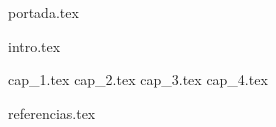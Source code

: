 \documentclass[12pt, a4paper]{article} %
\begin{document}

{portada.tex}

\newpage
{} 
\tableofcontents
\newpage

{intro.tex}
\newpage

{cap_1.tex}
\nopagebreak
{cap_2.tex}
\newpage
{cap_3.tex}
\newpage
{cap_4.tex}

{referencias.tex}
\end{document}
